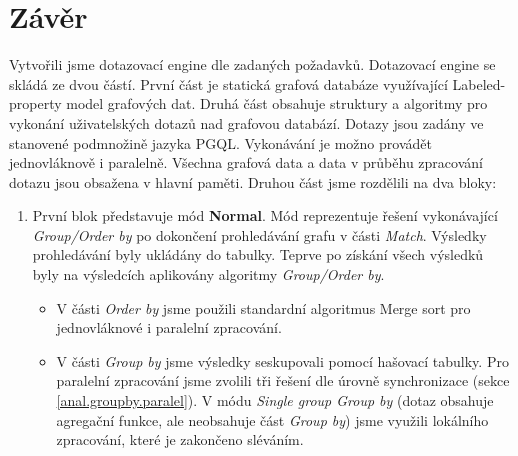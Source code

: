 \chapter*{Závěr}

Vytvořili jsme dotazovací engine dle zadaných požadavků.
Dotazovací engine se skládá ze dvou částí.
První část je statická grafová databáze využívající Labeled-property model grafových dat. 
Druhá část obsahuje struktury a algoritmy pro vykonání uživatelských dotazů nad grafovou databází.
Dotazy jsou zadány ve stanovené podmnožině jazyka PGQL.
Vykonávání je možno provádět jednovláknově i paralelně.
Všechna grafová data a data v průběhu zpracování dotazu jsou obsažena v hlavní paměti.
Druhou část jsme rozdělili na dva bloky:
\begin{enumerate}
\item
První blok představuje mód \textbf{Normal}.
Mód reprezentuje řešení vykonávající \textit{Group/Order by} po dokončení prohledávání grafu v části \textit{Match}.
Výsledky prohledávání byly ukládány do tabulky.
Teprve po získání všech výsledků byly na výsledcích aplikovány algoritmy \textit{Group/Order by}.
\begin{itemize}
\item V části \textit{Order by} jsme použili standardní algoritmus Merge sort pro jednovláknové i paralelní zpracování.
\item V části \textit{Group by} jsme výsledky seskupovali pomocí hašovací tabulky.
Pro paralelní zpracování jsme zvolili tři řešení dle úrovně synchronizace (sekce \ref{anal.groupby.paralel}).
V módu \textit{Single group Group by} (dotaz obsahuje agregační funkce, ale neobsahuje část \textit{Group by}) jsme využili lokálního zpracování, které je zakončeno sléváním.
\end{itemize}


\end{enumerate}
